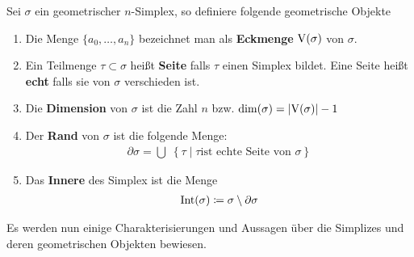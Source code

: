 \begin{Def}
  Sei $\sigma$ ein geometrischer $n$-Simplex, so definiere folgende
  geometrische Objekte
  \begin{enumerate}[\textbullet]%
  \item Die Menge $\{ a_0 , \ldots , a_n \}$ bezeichnet man als
    \textbf{Eckmenge} $\operatorname{V}(\sigma)$ von $\sigma$.
  \item Ein Teilmenge $\tau \subset \sigma$ heißt \textbf{Seite} falls
	  $\tau$ einen Simplex bildet. Eine Seite heißt \textbf{echt} falls sie von 
		$\sigma$ verschieden ist.
	\item Die \textbf{Dimension} von $\sigma$ ist die Zahl $n$ bzw. 
		$\dim(\sigma) = \left| \operatorname{V}(\sigma) \right| - 1$
  \item Der \textbf{Rand} von $\sigma$ ist die folgende Menge:
    \begin{gather*}
      \partial\sigma = \bigcup \; \left\{ \tau \; \Big| \; \tau \text{
          ist echte Seite von } \sigma \right\}
    \end{gather*}
  \item Das \textbf{Innere} des Simplex ist die Menge
    \begin{gather*}
    	\operatorname{Int}(\sigma) \coloneqq \sigma \setminus \partial\sigma
    \end{gather*}
  \end{enumerate}
\end{Def}


Es werden nun einige Charakterisierungen und Aussagen über die
Simplizes und deren geometrischen Objekten bewiesen.

